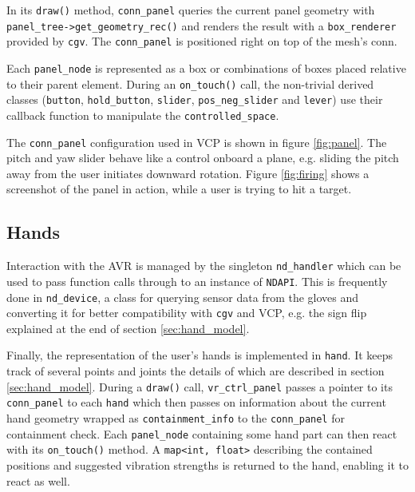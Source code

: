 \documentclass[hyperref, bachelorofscience]{cgvpub}
\begin{document}
In its \lstinline|draw()| method, \lstinline|conn_panel| queries the current panel geometry with \lstinline|panel_tree->get_geometry_rec()| and renders the result with a \lstinline|box_renderer| provided by \lstinline|cgv|. The \lstinline|conn_panel| is positioned right on top of the mesh's conn.

Each \lstinline|panel_node| is represented as a box or combinations of boxes placed relative to their parent element. During an \lstinline|on_touch()| call, the non-trivial derived classes (\lstinline|button|, \lstinline|hold_button|, \lstinline|slider|, \lstinline|pos_neg_slider| and \lstinline|lever|) use their callback function to manipulate the \lstinline|controlled_space|. 

The \lstinline|conn_panel| configuration used in \gls{VCP} is shown in figure \ref{fig:panel}. The pitch and yaw slider behave like a control onboard a plane, e.g. sliding the pitch away from the user initiates downward rotation. Figure \ref{fig:firing} shows a screenshot of the panel in action, while a user is trying to hit a target.

\subsection{Hands} \label{sec:devel:structure:hands}
Interaction with the \Gls{AVR} is managed by the singleton \lstinline|nd_handler| which can be used to pass function calls through to an instance of \lstinline|NDAPI|. This is frequently done in \lstinline|nd_device|, a class for querying sensor data from the gloves and converting it for better compatibility with \lstinline|cgv| and \gls{VCP}, e.g. the sign flip explained at the end of section \ref{sec:hand_model}.

Finally, the representation of the user's hands is implemented in \lstinline|hand|. It keeps track of several points and joints the details of which are described in section \ref{sec:hand_model}. During a \lstinline|draw()| call, \lstinline|vr_ctrl_panel| passes a pointer to its \lstinline|conn_panel| to each \lstinline|hand| which then passes on information about the current hand geometry wrapped as \lstinline|containment_info| to the \lstinline|conn_panel| for containment check. Each \lstinline|panel_node| containing some hand part can then react with its \lstinline|on_touch()| method. A \lstinline|map<int, float>| describing the contained positions and suggested vibration strengths is returned to the hand, enabling it to react as well.
\end{document}
